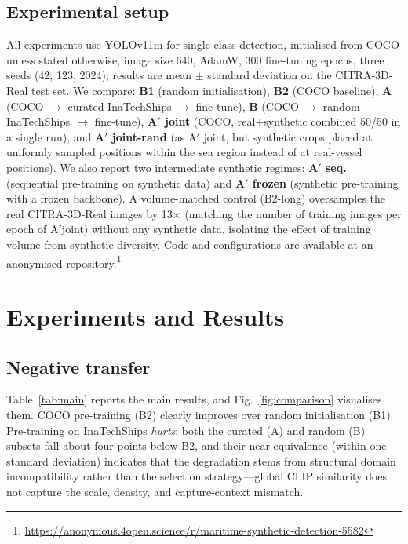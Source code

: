 \documentclass[10pt,conference]{IEEEtran}
\begin{document}
\subsection{Experimental setup}
All experiments use YOLOv11m \cite{jocher2023ultralytics} for single-class detection,
initialised from COCO unless stated otherwise, image size 640, AdamW, 300
fine-tuning epochs, three seeds (42, 123, 2024); results are mean $\pm$ standard
deviation on the CITRA-3D-Real test set. We compare: \textbf{B1} (random
initialisation), \textbf{B2} (COCO baseline), \textbf{A} (COCO $\rightarrow$
curated InaTechShips $\rightarrow$ fine-tune), \textbf{B} (COCO $\rightarrow$
random InaTechShips $\rightarrow$ fine-tune), \textbf{A$'$ joint} (COCO,
real+synthetic combined 50/50 in a single run), and \textbf{A$'$ joint-rand} (as
A$'$ joint, but synthetic crops placed at uniformly sampled positions within the
sea region instead of at real-vessel positions). We also report two intermediate
synthetic regimes: \textbf{A$'$ seq.} (sequential pre-training on synthetic data)
and \textbf{A$'$ frozen} (synthetic pre-training with a frozen backbone). A volume-matched control (B2-long) oversamples the real CITRA-3D-Real images by 13$\times$ (matching the number of training images per epoch of A$'$joint) without any synthetic data, isolating the effect of training volume from synthetic diversity. Code and
configurations are available at an anonymised
repository.\footnote{\url{https://anonymous.4open.science/r/maritime-synthetic-detection-5582}}

\section{Experiments and Results}

\subsection{Negative transfer}

Table~\ref{tab:main} reports the main results, and Fig.~\ref{fig:comparison} visualises them. COCO pre-training (B2) clearly
improves over random initialisation (B1). Pre-training on InaTechShips
\emph{hurts}: both the curated (A) and random (B) subsets fall about four points
below B2, and their near-equivalence (within one standard deviation) indicates
that the degradation stems from structural domain incompatibility rather than the
selection strategy---global CLIP similarity does not capture the scale, density,
and capture-context mismatch.
\end{document}
